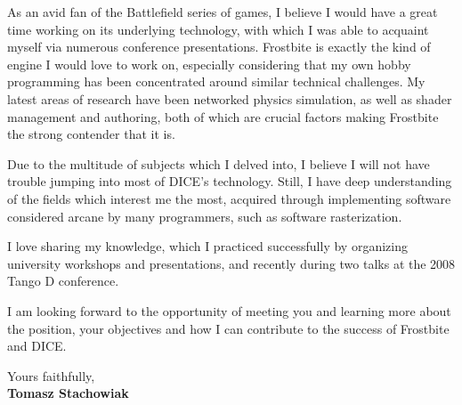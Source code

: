 \documentclass[11pt]{article}
\begin{document}
As an avid fan of the Battlefield series of games, I believe I would have a great time working on its underlying technology, with which I was able to acquaint myself via numerous conference presentations. Frostbite is exactly the kind of engine I would love to work on, especially considering that my own hobby programming has been concentrated around similar technical challenges. My latest areas of research have been networked physics simulation, as well as shader management and authoring, both of which are crucial factors making Frostbite the strong contender that it is.

Due to the multitude of subjects which I delved into, I believe I will not have trouble jumping into most of DICE's technology. Still, I have deep understanding of the fields which interest me the most, acquired through implementing software considered arcane by many programmers, such as software rasterization.

I love sharing my knowledge, which I practiced successfully by organizing university workshops and presentations, and recently during two talks at the 2008 Tango D conference.

I am looking forward to the opportunity of meeting you and learning more about the position, your objectives and how I can contribute to the success of Frostbite and DICE.
  
Yours faithfully,\\[2em] %
%
{\bfseries Tomasz Stachowiak}
%
\end{document}
